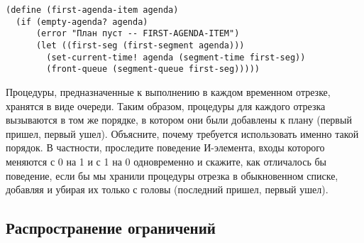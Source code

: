 \begin{Verbatim}[fontsize=\small]
(define (first-agenda-item agenda)
  (if (empty-agenda? agenda)
      (error "План пуст -- FIRST-AGENDA-ITEM")
      (let ((first-seg (first-segment agenda)))
        (set-current-time! agenda (segment-time first-seg))
        (front-queue (segment-queue first-seg)))))
\end{Verbatim}
\begin{exercise}{3.32}\label{EX3.32}%
Процедуры, предназначенные к выполнению в каждом
временном отрезке, хранятся в виде очереди.  Таким образом, процедуры
для каждого отрезка вызываются в том же порядке, в котором они были
добавлены к плану (первый пришел, первый ушел).  Объясните, почему
требуется использовать именно такой порядок.  В частности, проследите
поведение И-элемента, входы которого меняются с 0 на 1 и с 1 на 0
одновременно и скажите, как отличалось бы поведение, если бы мы
хранили процедуры отрезка в обыкновенном списке, добавляя и убирая их
только с головы (последний пришел, первый ушел).
\end{exercise}

\subsection{Распространение ограничений}
\label{PROPAGATION-OF-CONSTRAINTS}


